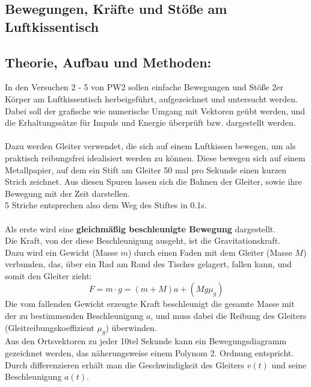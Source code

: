 \documentclass[12pt,a4paper]{article}
\begin{document}
\begin{multicols}{2}

\section{Bewegungen, Kräfte und Stöße am Luftkissentisch}

\subsection{Theorie, Aufbau und Methoden:}
In den Versuchen 2 - 5 von PW2 sollen einfache Bewegungen und Stöße 2er Körper am Luftkissentisch herbeigeführt, aufgezeichnet und untersucht werden.\\
Dabei soll der grafische wie numerische Umgang mit Vektoren geübt werden, und die Erhaltungssätze für Impuls und Energie überprüft bzw. dargestellt werden.\\
\\
Dazu werden Gleiter verwendet, die sich auf einem Luftkissen bewegen, um als praktisch reibungsfrei idealisiert werden zu können. Diese bewegen sich auf einem Metallpapier, auf dem ein Stift am Gleiter 50 mal pro Sekunde einen kurzen Strich zeichnet. Aus diesen Spuren lassen sich die Bahnen der Gleiter, sowie ihre Bewegung mit der Zeit darstellen.\\
5 Striche entsprechen also dem Weg des Stiftes in 0.1s.\\
\\
Als erste wird eine \textbf{gleichmäßig beschleunigte Bewegung} dargestellt.\\
Die Kraft, von der diese Beschleunigung ausgeht, ist die Gravitationskraft.\\
Dazu wird ein Gewicht (Masse $m$) durch einen Faden mit dem Gleiter (Masse $M$) verbunden, das, über ein Rad am Rand des Tisches gelagert, fallen kann, und somit den Gleiter zieht:\\
$$F=m \cdot g = (m+M)a + (Mg \mu_g )$$
Die vom fallenden Gewicht erzeugte Kraft beschleunigt die gesamte Masse mit der zu bestimmenden Beschleunigung $a$, und muss dabei die Reibung des Gleiters (Gleitreibungskoeffizient $\mu_g$) überwinden.\\
Aus den Ortsvektoren zu jeder 10tel Sekunde kann ein Bewegungsdiagramm gezeichnet werden, das näherungsweise einem Polynom 2. Ordnung entspricht. Durch differenzieren erhält man die Geschwindigkeit des Gleiters $v(t)$ und seine Beschleunigung $a(t)$.\\
\\

\end{multicols}
\end{document}
